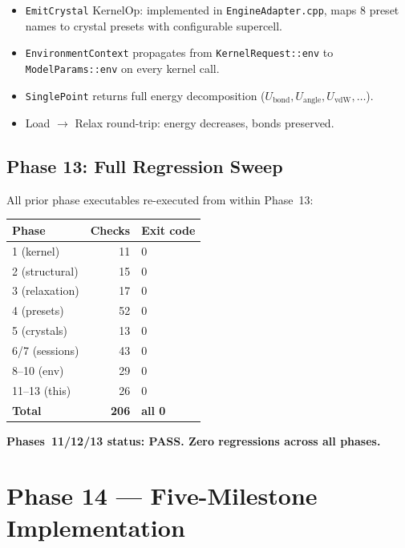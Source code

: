 \documentclass[11pt]{article}
\begin{document}
\begin{itemize}
\item \texttt{EmitCrystal} KernelOp: implemented in \texttt{EngineAdapter.cpp},
      maps 8 preset names to crystal presets with configurable supercell.
\item \texttt{EnvironmentContext} propagates from \texttt{KernelRequest::env}
      to \texttt{ModelParams::env} on every kernel call.
\item \texttt{SinglePoint} returns full energy decomposition
      ($U_{\mathrm{bond}}, U_{\mathrm{angle}}, U_{\mathrm{vdW}}, \ldots$).
\item Load $\to$ Relax round-trip: energy decreases, bonds preserved.
\end{itemize}

\subsection{Phase 13: Full Regression Sweep}

All prior phase executables re-executed from within Phase~13:

\begin{center}
\begin{tabular}{lrl}
\toprule
Phase & Checks & Exit code \\
\midrule
1 (kernel)     & 11 & 0 \\
2 (structural) & 15 & 0 \\
3 (relaxation) & 17 & 0 \\
4 (presets)    & 52 & 0 \\
5 (crystals)   & 13 & 0 \\
6/7 (sessions) & 43 & 0 \\
8--10 (env)    & 29 & 0 \\
11--13 (this)  & 26 & 0 \\
\midrule
\textbf{Total} & \textbf{206} & \textbf{all 0} \\
\bottomrule
\end{tabular}
\end{center}

\textbf{Phases~11/12/13 status: PASS.  Zero regressions across all phases.}

\section{Phase 14 --- Five-Milestone Implementation}
\end{document}
